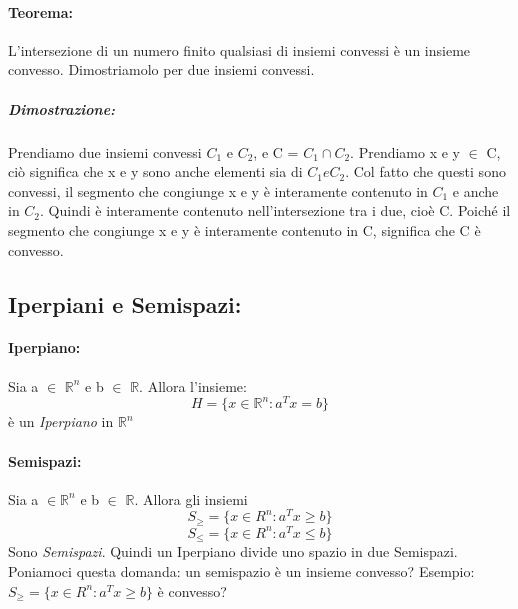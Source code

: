 \paragraph{Teorema:} L'intersezione di un numero finito qualsiasi di insiemi convessi è un insieme convesso. Dimostriamolo per due insiemi convessi. 

\subparagraph{Dimostrazione:} Prendiamo due insiemi convessi $C_1$ e $C_2$, e C = $C_1 \cap C_2$. Prendiamo x e y $\in$ C, ciò significa che x e y sono anche elementi sia di $C_1 e C_2$. Col fatto che questi sono convessi, il segmento che congiunge x e y è interamente contenuto in $C_1$ e anche in $C_2$. Quindi è interamente contenuto nell'intersezione tra i due, cioè C. Poiché il segmento che congiunge x e y è interamente contenuto in C, significa che C è convesso.



\subsection{Iperpiani e Semispazi:} 

\paragraph{Iperpiano:} Sia a $\in$ $\mathbb{R}^n$ e b $\in$ $\mathbb{R}$. Allora l'insieme:
\begin{equation*}
    H = \{x \in \mathbb{R}^n: a^{T}x = b\}
\end{equation*}
è un \textit{Iperpiano} in $\mathbb{R}^n$


\paragraph{Semispazi:} Sia a $\in \mathbb{R}^n$ e b $\in$ $\mathbb{R}$. Allora gli insiemi
\begin{equation*}
    S_{\geq} = \{x \in R^n: a^Tx \geq b\}
\end{equation*}
\begin{equation*}
    S_{\leq} = \{x \in R^n: a^Tx \leq b\}
\end{equation*}
Sono \textit{Semispazi}. Quindi un Iperpiano divide uno spazio in due Semispazi. Poniamoci questa domanda: un semispazio è un insieme convesso? Esempio:
$S_{\geq} = \{x \in R^n: a^Tx \geq b\}$ è convesso?

